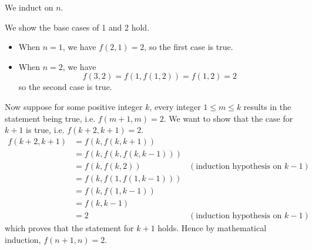 \begin{questions}
\begin{partquestions}{\roman*}
        \item We induct on $n$.

        We show the base cases of 1 and 2 hold.
        \begin{itemize}
            \item When $n = 1$, we have $f(2, 1) = 2$, so the first case is true.
            \item When $n = 2$, we have
            \[
                f(3,2) = f(1, f(1, 2)) = f(1, 2) = 2
            \]
            so the second case is true.
        \end{itemize}

        Now suppose for some positive integer $k$, every integer $1 \leq m \leq k$ results in the statement being true, i.e. $f(m+1,m) = 2$. We want to show that the case for $k+1$ is true, i.e. $f(k+2, k+1) = 2$.
        \begin{align*}
            f(k+2, k+1) &= f(k, f(k, k+1))\\
            &= f(k, f(k, f(k, k-1)))\\
            &= f(k, f(k, 2)) & (\text{induction hypothesis on } k-1)\\
            &= f(k, f(1, f(1, k-1)))\\
            &= f(k, f(1, k-1))\\
            &= f(k, k-1) \\
            &= 2 & (\text{induction hypothesis on } k-1)
        \end{align*}
        which proves that the statement for $k+1$ holds. Hence by mathematical induction, $f(n+1, n) = 2$.


\end{partquestions}
\end{questions}
